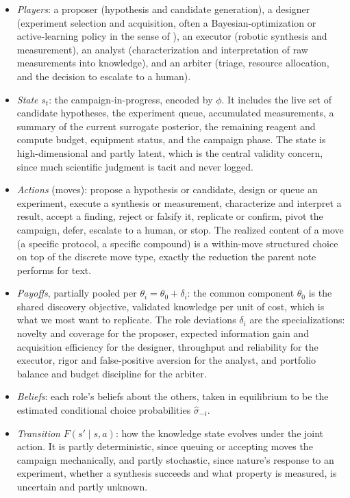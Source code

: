 \documentclass[11pt]{article}
\theoremstyle{definition}
\begin{document}
\begin{itemize}[leftmargin=1.4em,itemsep=2pt,topsep=2pt]
  \item \emph{Players}: a proposer (hypothesis and candidate generation), a designer (experiment selection and acquisition, often a Bayesian-optimization or active-learning policy in the sense of \citealp{shahriari2016}), an executor (robotic synthesis and measurement), an analyst (characterization and interpretation of raw measurements into knowledge), and an arbiter (triage, resource allocation, and the decision to escalate to a human).
  \item \emph{State} $s_t$: the campaign-in-progress, encoded by $\phi$. It includes the live set of candidate hypotheses, the experiment queue, accumulated measurements, a summary of the current surrogate posterior, the remaining reagent and compute budget, equipment status, and the campaign phase. The state is high-dimensional and partly latent, which is the central validity concern, since much scientific judgment is tacit and never logged.
  \item \emph{Actions} (moves): propose a hypothesis or candidate, design or queue an experiment, execute a synthesis or measurement, characterize and interpret a result, accept a finding, reject or falsify it, replicate or confirm, pivot the campaign, defer, escalate to a human, or stop. The realized content of a move (a specific protocol, a specific compound) is a within-move structured choice on top of the discrete move type, exactly the reduction the parent note performs for text.
  \item \emph{Payoffs}, partially pooled per $\theta_i = \theta_0 + \delta_i$: the common component $\theta_0$ is the shared discovery objective, validated knowledge per unit of cost, which is what we most want to replicate. The role deviations $\delta_i$ are the specializations: novelty and coverage for the proposer, expected information gain and acquisition efficiency for the designer, throughput and reliability for the executor, rigor and false-positive aversion for the analyst, and portfolio balance and budget discipline for the arbiter.
  \item \emph{Beliefs}: each role's beliefs about the others, taken in equilibrium to be the estimated conditional choice probabilities $\hat\sigma_{-i}$.
  \item \emph{Transition} $F(s'\mid s,a)$: how the knowledge state evolves under the joint action. It is partly deterministic, since queuing or accepting moves the campaign mechanically, and partly stochastic, since nature's response to an experiment, whether a synthesis succeeds and what property is measured, is uncertain and partly unknown.
\end{itemize}
\end{document}
